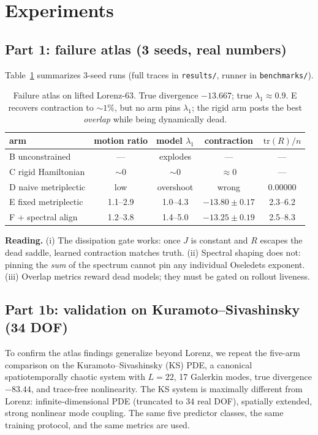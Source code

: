 \documentclass[preprint,12pt]{article}
\begin{document}
\section{Experiments}

\subsection{Part 1: failure atlas (3 seeds, real numbers)}

Table~\ref{tab:atlas} summarizes 3-seed runs (full traces in
\texttt{results/}, runner in \texttt{benchmarks/}).

\begin{table}[t]
\centering
\small
\begin{tabular}{lcccc}
\toprule
arm & motion ratio & model $\lambda_1$ & contraction & $\mathrm{tr}(R)/n$ \\
\midrule
B unconstrained & --- & explodes & --- & --- \\
C rigid Hamiltonian & $\sim 0$ & $\sim 0$ & $\approx 0$ & --- \\
D naive metriplectic & low & overshoot & wrong & $0.00000$ \\
E fixed metriplectic & 1.1--2.9 & 1.0--4.3 & $\mathbf{-13.80\pm0.17}$ & 2.3--6.2 \\
F + spectral align & 1.2--3.8 & 1.4--5.0 & $-13.25\pm0.19$ & 2.5--8.3 \\
\bottomrule
\end{tabular}
\caption{Failure atlas on lifted Lorenz-63. True divergence $-13.667$;
true $\lambda_1 \approx 0.9$. E recovers contraction to $\sim1\%$, but no
arm pins $\lambda_1$; the rigid arm posts the best \emph{overlap} while
being dynamically dead.}
\label{tab:atlas}
\end{table}

\textbf{Reading.} (i) The dissipation gate works: once $J$ is constant and
$R$ escapes the dead saddle, learned contraction matches truth. (ii)
Spectral shaping does not: pinning the \emph{sum} of the spectrum cannot
pin any individual Oseledets exponent. (iii) Overlap metrics reward dead
models; they must be gated on rollout liveness.

\subsection{Part 1b: validation on Kuramoto--Sivashinsky (34 DOF)}

To confirm the atlas findings generalize beyond Lorenz, we repeat the
five-arm comparison on the Kuramoto--Sivashinsky (KS) PDE, a canonical
spatiotemporally chaotic system with $L=22$, 17 Galerkin modes, true
divergence $-83.44$, and trace-free nonlinearity. The KS system is
maximally different from Lorenz: infinite-dimensional PDE (truncated to
34 real DOF), spatially extended, strong nonlinear mode coupling. The
same five predictor classes, the same training protocol, and the same
metrics are used.
\end{document}
